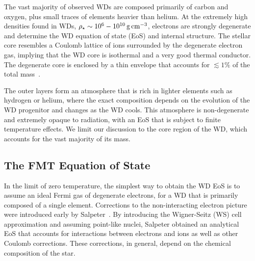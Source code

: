 The vast majority of observed WDs are composed primarily of carbon and oxygen, plus small traces of elements heavier than helium. 
At the extremely high densities found in WDs, $\rho_\star\sim 10^6-10^{10}{\rm \,g}{\rm \,cm}^{-3}$, electrons are strongly degenerate and determine the WD equation of state (EoS) and internal structure.  The stellar core resembles a Coulomb lattice of ions surrounded by the degenerate electron gas, implying that the WD core is isothermal and a very good thermal conductor. 
The degenerate core is enclosed by a thin envelope that accounts for $\lesssim 1\%$  of the total mass~\cite{Fontaine_apr_Potentialwhitedwarf}. 

The outer layers form an atmosphere that is rich in lighter elements such as hydrogen or helium, where the exact composition depends on the evolution of the WD progenitor and changes as the WD cools. 
This atmosphere is non-degenerate and extremely opaque to radiation, with an EoS that is subject to finite temperature effects. We limit our discussion to the core region of the WD, which accounts for the vast majority of its mass.

\subsection{The FMT Equation of State}
\label{ch2:sec:FMT_EoS}


In the limit of zero temperature, the simplest way to obtain the WD EoS is to assume an ideal Fermi gas of degenerate electrons, for a WD that is primarily composed of a single element. Corrections to the non-interacting electron picture were introduced early by Salpeter~\cite{Salpeter:1961zz_nov_Energypressurezerotemperature}. By introducing the Wigner-Seitz (WS) cell approximation and assuming point-like nuclei, Salpeter obtained an analytical EoS that accounts for interactions between electrons and ions as well as other Coulomb corrections. These corrections, in general, depend on the chemical composition of the star. 

